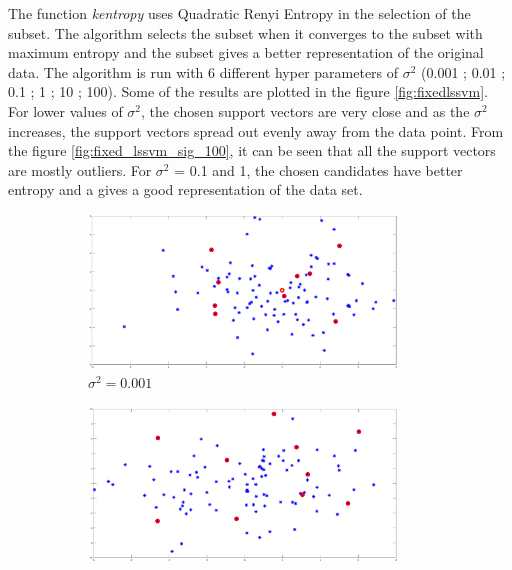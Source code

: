 The function \textit{kentropy} uses Quadratic Renyi Entropy in the selection of the subset. The algorithm selects the subset when it converges to the subset with maximum entropy and the subset gives a better representation of the original data. The algorithm is run with 6 different hyper parameters of $\sigma^2$ (0.001 ; 0.01 ; 0.1 ; 1 ; 10 ; 100). Some of the results are plotted in the figure \ref{fig:fixedlssvm}. For lower values of $\sigma^2$, the chosen support vectors are very close and as the $\sigma^2$ increases, the support vectors spread out evenly  away from the data point. From the figure \ref{fig:fixed_lssvm_sig_100}, it can be seen that all the support vectors are mostly outliers. For $\sigma^2$ = 0.1 and 1, the chosen candidates have better entropy and a gives a good representation of the data set.
\begin{figure}[!htpb]
	\begin{subfigure}[b]{0.25\textwidth}
		\centering
		\includegraphics[height= 0.65\textwidth, width = 0.9\textwidth]{Exercise3/Report/fixed_lssvm_sig_0.001}
		\caption{$\sigma^2 = 0.001$ }\label{fig:fixed_lssvm_sig_0.001}
	\end{subfigure}%
	\begin{subfigure}[b]{0.25\textwidth}
		\centering
		\includegraphics[height= 0.65\textwidth, width = 0.9\textwidth]{Exercise3/Report/fixed_lssvm_sig_0.1}

\end{subfigure}
\end{figure}

